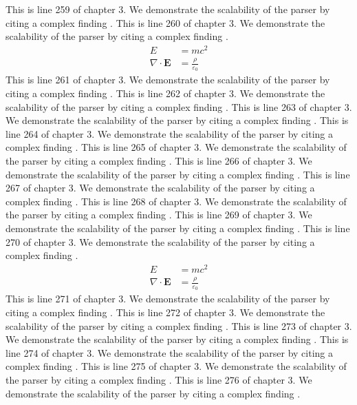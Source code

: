 This is line 259 of chapter 3. We demonstrate the scalability of the parser by citing a complex finding \cite{ref3_259}.
This is line 260 of chapter 3. We demonstrate the scalability of the parser by citing a complex finding \cite{ref3_260}.
\begin{align*}
  E &= mc^2 \\
  \nabla \cdot \mathbf{E} &= \frac{\rho}{\varepsilon_0}
\end{align*}
This is line 261 of chapter 3. We demonstrate the scalability of the parser by citing a complex finding \cite{ref3_261}.
This is line 262 of chapter 3. We demonstrate the scalability of the parser by citing a complex finding \cite{ref3_262}.
This is line 263 of chapter 3. We demonstrate the scalability of the parser by citing a complex finding \cite{ref3_263}.
This is line 264 of chapter 3. We demonstrate the scalability of the parser by citing a complex finding \cite{ref3_264}.
This is line 265 of chapter 3. We demonstrate the scalability of the parser by citing a complex finding \cite{ref3_265}.
This is line 266 of chapter 3. We demonstrate the scalability of the parser by citing a complex finding \cite{ref3_266}.
This is line 267 of chapter 3. We demonstrate the scalability of the parser by citing a complex finding \cite{ref3_267}.
This is line 268 of chapter 3. We demonstrate the scalability of the parser by citing a complex finding \cite{ref3_268}.
This is line 269 of chapter 3. We demonstrate the scalability of the parser by citing a complex finding \cite{ref3_269}.
This is line 270 of chapter 3. We demonstrate the scalability of the parser by citing a complex finding \cite{ref3_270}.
\begin{align*}
  E &= mc^2 \\
  \nabla \cdot \mathbf{E} &= \frac{\rho}{\varepsilon_0}
\end{align*}
This is line 271 of chapter 3. We demonstrate the scalability of the parser by citing a complex finding \cite{ref3_271}.
This is line 272 of chapter 3. We demonstrate the scalability of the parser by citing a complex finding \cite{ref3_272}.
This is line 273 of chapter 3. We demonstrate the scalability of the parser by citing a complex finding \cite{ref3_273}.
This is line 274 of chapter 3. We demonstrate the scalability of the parser by citing a complex finding \cite{ref3_274}.
This is line 275 of chapter 3. We demonstrate the scalability of the parser by citing a complex finding \cite{ref3_275}.
This is line 276 of chapter 3. We demonstrate the scalability of the parser by citing a complex finding \cite{ref3_276}.
